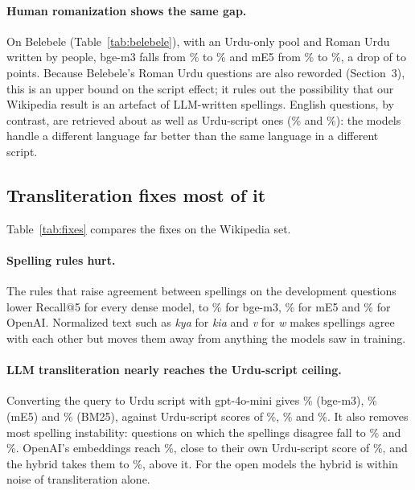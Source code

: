 \paragraph{Human romanization shows the same gap.} On Belebele (Table~\ref{tab:belebele}), with an Urdu-only pool and Roman Urdu written by people, bge-m3 falls from \% to \% and mE5 from \% to \%, a drop of \BbDropMin{} to \BbDropMax{} points. Because Belebele's Roman Urdu questions are also reworded (Section~3), this is an upper bound on the script effect; it rules out the possibility that our Wikipedia result is an artefact of LLM-written spellings. English questions, by contrast, are retrieved about as well as Urdu-script ones (\% and \%): the models handle a different language far better than the same language in a different script.

\subsection{Transliteration fixes most of it}

Table~\ref{tab:fixes} compares the fixes on the Wikipedia set.

\paragraph{Spelling rules hurt.} The \WikiNRules{} rules that raise agreement between spellings on the development questions lower Recall@5 for every dense model, to \% for bge-m3, \% for mE5 and \% for OpenAI. Normalized text such as \textit{kya} for \textit{kia} and \textit{v} for \textit{w} makes spellings agree with each other but moves them away from anything the models saw in training.

\paragraph{LLM transliteration nearly reaches the Urdu-script ceiling.} Converting the query to Urdu script with gpt-4o-mini gives \% (bge-m3), \% (mE5) and \% (BM25), against Urdu-script scores of \%, \% and \%. It also removes most spelling instability: questions on which the spellings disagree fall to \% and \%. OpenAI's embeddings reach \%, close to their own Urdu-script score of \%, and the hybrid takes them to \%, above it. For the open models the hybrid is within noise of transliteration alone.

